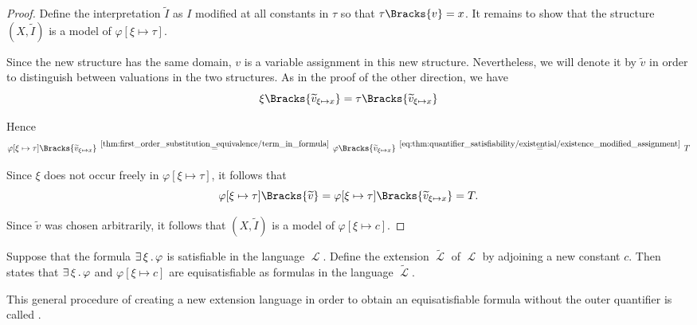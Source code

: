 \begin{proof}
  Define the interpretation \( \widetilde I \) as \( I \) modified at all constants in \( \tau \) so that \( \tau\Bracks{v} = x \). It remains to show that the structure \( (X, \widetilde I) \) is a model of \( \varphi[\xi \mapsto \tau] \).

  Since the new structure has the same domain, \( v \) is a variable assignment in this new structure. Nevertheless, we will denote it by \( \widetilde v \) in order to distinguish between valuations in the two structures. As in the proof of the other direction, we have
  \begin{equation*}
    \xi\Bracks{\widetilde v_{\xi \mapsto x}}
    =
    \tau\Bracks{\widetilde v_{\xi \mapsto x}}
  \end{equation*}

  Hence
  \begin{equation*}
    \varphi[\xi \mapsto \tau]\Bracks{\widetilde v_{\xi \mapsto x}}
    \reloset {\ref{thm:first_order_substitution_equivalence/term_in_formula}} =
    \varphi\Bracks{\widetilde v_{\xi \mapsto x}}
    \reloset {\eqref{eq:thm:quantifier_satisfiability/existential/existence_modified_assignment}} =
    T
  \end{equation*}

  Since \( \xi \) does not occur freely in \( \varphi[\xi \mapsto \tau] \), it follows that
  \begin{equation*}
    \varphi[\xi \mapsto \tau]\Bracks{\widetilde v} = \varphi[\xi \mapsto \tau]\Bracks{\widetilde v_{\xi \mapsto x}} = T.
  \end{equation*}

  Since \( \widetilde v \) was chosen arbitrarily, it follows that \( (X, \widetilde I) \) is a model of \( \varphi[\xi \mapsto c] \).
\end{proof}

\begin{remark}\label{rem:existential_quantifier_removal}
  Suppose that the formula \( \exists \thinspace \xi \thinspace . \thinspace \varphi \) is satisfiable in the language \( \mscrL \). Define the extension \( \widetilde \mscrL \)  of \( \mscrL \) by adjoining a new constant \( c \). Then  states that \( \exists \thinspace \xi \thinspace . \thinspace \varphi \) and \( \varphi[\xi \mapsto c] \) are equisatisfiable as formulas in the language \( \widetilde \mscrL \).

  This general procedure of creating a new extension language in order to obtain an equisatisfiable formula without the outer quantifier is called .
\end{remark}

